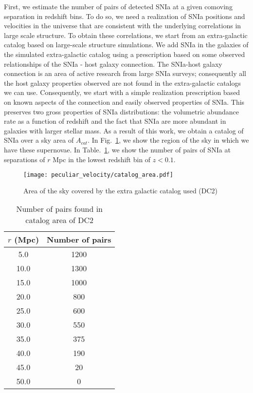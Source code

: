 First, we estimate the number of pairs of detected SNIa at a given comoving separation in redshift bins. To do so, we need a realization of SNIa positions and velocities in the universe that are consistent with the underlying correlations in large scale structure. To obtain these correlations, we start from an extra-galactic catalog based on large-scale structure simulations. We add SNIa in the galaxies of the simulated extra-galactic catalog using a prescription based on some observed relationships of the SNIa - host galaxy connection. The SNIa-host galaxy connection is an area of active research from large SNIa surveys; consequently all the host galaxy properties observed are not found in the extra-galactic catalogs we can use. Consequently, we start with a simple realization prescription based on known aspects of the connection and easily observed properties of SNIa. This preserves two gross properties of SNIa distributions: the volumetric abundance rate as a function of redshift and the fact that SNIa are more abundant in galaxies with larger stellar mass. As a result of this work, we obtain a catalog of SNIa over a sky area of $A_{cat}.$ In Fig.~\ref{fig:catalog_area}, we show the region of the sky in which we have these supernovae. In Table.~\ref{tab:numpairscat}, we show the number of pairs of SNIa at separations of $r$ Mpc in the lowest redshift bin of $z < 0.1.$

\begin{figure}
    \begin{center}
        {\texttt{[image: peculiar\_velocity/catalog\_area.pdf]}}
        \caption{Area of the sky covered by the extra galactic catalog used (DC2)}
        \label{fig:catalog_area}
    \end{center}
\end{figure}

\begin{table}
\begin{center}
\begin{tabular}{|c|c|}
    \hline
    $r$ (Mpc) &  Number of pairs \\
\hline
  5.0 &  1200 \\
 10.0 &  1300 \\
 15.0 &  1000 \\
 20.0 &   800 \\
 25.0 &   600 \\
 30.0 &   550 \\
 35.0 &   375 \\
 40.0 &   190 \\
 45.0 &    20 \\
 50.0 &     0 \\
\hline
\end{tabular}
\end{center}
\caption{Number of pairs found in catalog area of DC2}
\label{tab:numpairscat}
\end{table}




